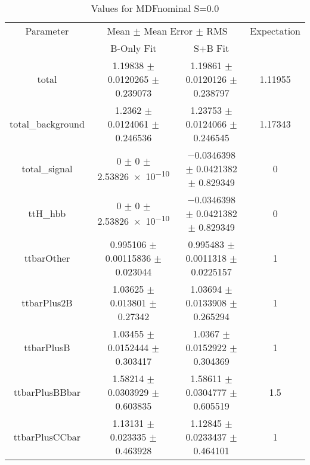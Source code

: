 \begin{table}
\centering
\caption{Values for MDFnominal S=0.0}
\begin{tabular}{cccc}
\toprule
Parameter & \multicolumn{2}{c}{Mean $\pm$ Mean Error $\pm$ RMS} & Expectation\\
 & B-Only Fit & S+B Fit & \\
\midrule
total & \num{1.19838} $\pm$ \num{0.0120265} $\pm$ \num{0.239073} & \num{1.19861} $\pm$ \num{0.0120126} $\pm$ \num{0.238797} & \num{1.11955}\\
total\_background & \num{1.2362} $\pm$ \num{0.0124061} $\pm$ \num{0.246536} & \num{1.23753} $\pm$ \num{0.0124066} $\pm$ \num{0.246545} & \num{1.17343}\\
total\_signal & \num{0} $\pm$ \num{0} $\pm$ \num{2.53826e-10} & \num{-0.0346398} $\pm$ \num{0.0421382} $\pm$ \num{0.829349} & \num{0}\\
ttH\_hbb & \num{0} $\pm$ \num{0} $\pm$ \num{2.53826e-10} & \num{-0.0346398} $\pm$ \num{0.0421382} $\pm$ \num{0.829349} & \num{0}\\
ttbarOther & \num{0.995106} $\pm$ \num{0.00115836} $\pm$ \num{0.023044} & \num{0.995483} $\pm$ \num{0.0011318} $\pm$ \num{0.0225157} & \num{1}\\
ttbarPlus2B & \num{1.03625} $\pm$ \num{0.013801} $\pm$ \num{0.27342} & \num{1.03694} $\pm$ \num{0.0133908} $\pm$ \num{0.265294} & \num{1}\\
ttbarPlusB & \num{1.03455} $\pm$ \num{0.0152444} $\pm$ \num{0.303417} & \num{1.0367} $\pm$ \num{0.0152922} $\pm$ \num{0.304369} & \num{1}\\
ttbarPlusBBbar & \num{1.58214} $\pm$ \num{0.0303929} $\pm$ \num{0.603835} & \num{1.58611} $\pm$ \num{0.0304777} $\pm$ \num{0.605519} & \num{1.5}\\
ttbarPlusCCbar & \num{1.13131} $\pm$ \num{0.023335} $\pm$ \num{0.463928} & \num{1.12845} $\pm$ \num{0.0233437} $\pm$ \num{0.464101} & \num{1}\\
\bottomrule
\end{tabular}
\end{table}